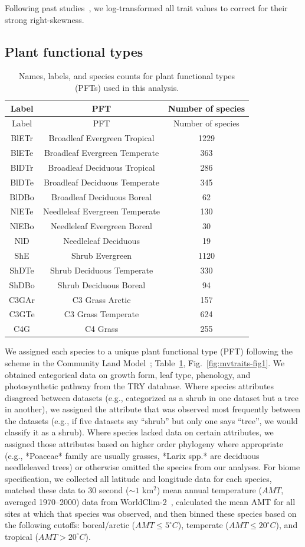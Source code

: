 Following past studies~\cite{wright_worldwide_2004,wright_assessing_2005,onoda_2011_global,diaz_global_2016}, we log-transformed all trait values to correct for their strong right-skewness.

\subsection{Plant functional types}

\begin{longtable}[]{@{}ccc@{}}
\caption{\label{tab:pfts}Names, labels, and species counts for plant
functional types (PFTs) used in this analysis.}\tabularnewline
\toprule
Label & PFT & Number of species\tabularnewline
\midrule
\endfirsthead
\toprule
Label & PFT & Number of species\tabularnewline
\midrule
\endhead
BlETr & Broadleaf Evergreen Tropical & 1229\tabularnewline
BlETe & Broadleaf Evergreen Temperate & 363\tabularnewline
BlDTr & Broadleaf Deciduous Tropical & 286\tabularnewline
BlDTe & Broadleaf Deciduous Temperate & 345\tabularnewline
BlDBo & Broadleaf Deciduous Boreal & 62\tabularnewline
NlETe & Needleleaf Evergreen Temperate & 130\tabularnewline
NlEBo & Needleleaf Evergreen Boreal & 30\tabularnewline
NlD & Needleleaf Deciduous & 19\tabularnewline
ShE & Shrub Evergreen & 1120\tabularnewline
ShDTe & Shrub Deciduous Temperate & 330\tabularnewline
ShDBo & Shrub Deciduous Boreal & 94\tabularnewline
C3GAr & C3 Grass Arctic & 157\tabularnewline
C3GTe & C3 Grass Temperate & 624\tabularnewline
C4G & C4 Grass & 255\tabularnewline
\bottomrule
\end{longtable}

We assigned each species to a unique plant functional type (PFT) following the scheme in the Community Land Model~\cite[CLM4.5, ]{clm45_note}; Table~\ref{tab:pfts}, Fig.~\ref{fig:mvtraits-fig1}. %
We obtained categorical data on growth form, leaf type, phenology, and photosynthetic pathway from the TRY database.
Where species attributes disagreed between datasets (e.g., categorized as a shrub in one dataset but a tree in another), we assigned the attribute that was observed most frequently between the datasets (e.g., if five datasets say ``shrub'' but only one says ``tree'', we would classify it as a shrub).
Where species lacked data on certain attributes, we assigned those attributes based on higher order phylogeny where appropriate (e.g., *Poaceae* family are usually grasses, *Larix spp.* are deciduous needleleaved trees) or otherwise omitted the species from our analyses.
For biome specification, we collected all latitude and longitude data for each species,
matched these data to 30 second ($\sim1$ km$^{2}$) mean annual temperature ($AMT$, averaged 1970--2000) data from WorldClim-2~\cite{worldclim},
calculated the mean AMT for all sites at which that species was observed,
and then binned these species based on the following cutoffs: boreal/arctic ($AMT \leq 5^\circ C$), temperate ($AMT \leq 20^\circ C$), and tropical ($AMT > 20^\circ C$).

